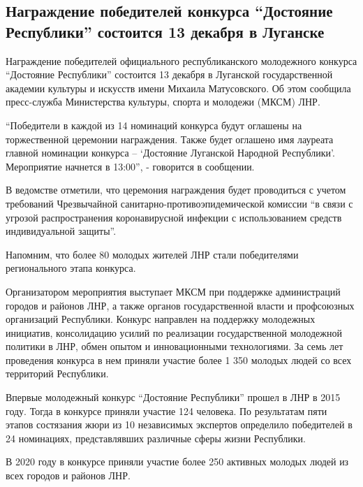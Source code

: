  
 
 
 
 
\subsection{Награждение победителей конкурса \enquote{Достояние Республики} состоится 13 декабря в Луганске}
\label{sec:10_12_2021.stz.news.lnr.lug_info.1.nagrazhdenie_konkurs_dostojanie_respubliki}

Награждение победителей официального республиканского молодежного конкурса
\enquote{Достояние Республики} состоится 13 декабря в Луганской государственной
академии культуры и искусств имени Михаила Матусовского. Об этом сообщила
пресс-служба Министерства культуры, спорта и молодежи (МКСМ) ЛНР.


\enquote{Победители в каждой из 14 номинаций конкурса будут оглашены на торжественной
церемонии награждения. Также будет оглашено имя лауреата главной номинации
конкурса – \enquote{Достояние Луганской Народной Республики}. Мероприятие начнется в
13:00}, - говорится в сообщении.

В ведомстве отметили, что церемония награждения будет проводиться с учетом
требований Чрезвычайной санитарно-противоэпидемической комиссии \enquote{в связи с
угрозой распространения коронавирусной инфекции с использованием средств
индивидуальной защиты}.

Напомним, что более 80 молодых жителей ЛНР стали победителями регионального
этапа конкурса.

Организатором мероприятия выступает МКСМ при поддержке администраций городов и
районов ЛНР, а также органов государственной власти и профсоюзных организаций
Республики. Конкурс направлен на поддержку молодежных инициатив, консолидацию
усилий по реализации государственной молодежной политики в ЛНР, обмен опытом и
инновационными технологиями. За семь лет проведения конкурса в нем приняли
участие более 1 350 молодых людей со всех территорий Республики.

Впервые молодежный конкурс \enquote{Достояние Республики} прошел в ЛНР в 2015 году.
Тогда в конкурсе приняли участие 124 человека. По результатам пяти этапов
состязания жюри из 10 независимых экспертов определило победителей в 24
номинациях, представлявших различные сферы жизни Республики.

В 2020 году в конкурсе приняли участие более 250 активных молодых людей из всех
городов и районов ЛНР.
